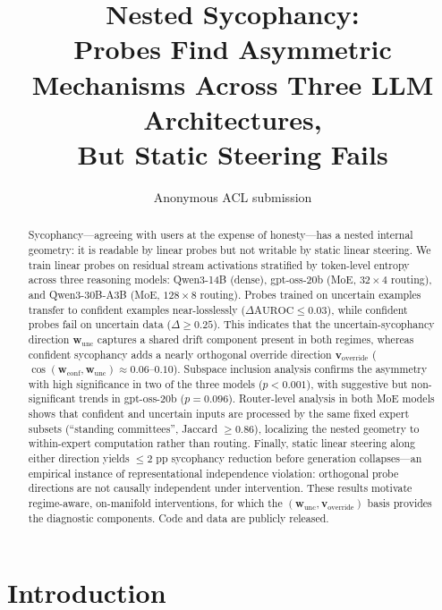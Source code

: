 \documentclass[11pt]{article}
\title{Nested Sycophancy:\\Probes Find Asymmetric Mechanisms Across Three LLM Architectures,\\But Static Steering Fails}
\author{Anonymous ACL submission}
\begin{document}
\maketitle

\begin{abstract}
Sycophancy---agreeing with users at the expense of honesty---has a nested internal geometry: it is readable by linear probes but not writable by static linear steering.
We train linear probes on residual stream activations stratified by token-level entropy across three reasoning models: Qwen3-14B (dense), gpt-oss-20b (MoE, $32 \times 4$ routing), and Qwen3-30B-A3B (MoE, $128 \times 8$ routing).
Probes trained on uncertain examples transfer to confident examples near-losslessly ($\Delta\mathrm{AUROC} \leq 0.03$), while confident probes fail on uncertain data ($\Delta \geq 0.25$).
This indicates that the uncertain-sycophancy direction $\mathbf{w}_{\text{unc}}$ captures a shared drift component present in both regimes, whereas confident sycophancy adds a nearly orthogonal override direction $\mathbf{v}_{\text{override}}$ ($\cos(\mathbf{w}_{\text{conf}}, \mathbf{w}_{\text{unc}}) \approx 0.06$--$0.10$).
Subspace inclusion analysis confirms the asymmetry with high significance in two of the three models ($p < 0.001$), with suggestive but non-significant trends in gpt-oss-20b ($p = 0.096$).
Router-level analysis in both MoE models shows that confident and uncertain inputs are processed by the same fixed expert subsets (``standing committees'', Jaccard $\geq 0.86$), localizing the nested geometry to within-expert computation rather than routing.
Finally, static linear steering along either direction yields $\leq 2$ pp sycophancy reduction before generation collapses---an empirical instance of representational independence violation: orthogonal probe directions are not causally independent under intervention.
These results motivate regime-aware, on-manifold interventions, for which the $(\mathbf{w}_{\text{unc}}, \mathbf{v}_{\text{override}})$ basis provides the diagnostic components.
Code and data are publicly released.
\end{abstract}

\section{Introduction}
\label{sec:intro}
\end{document}
